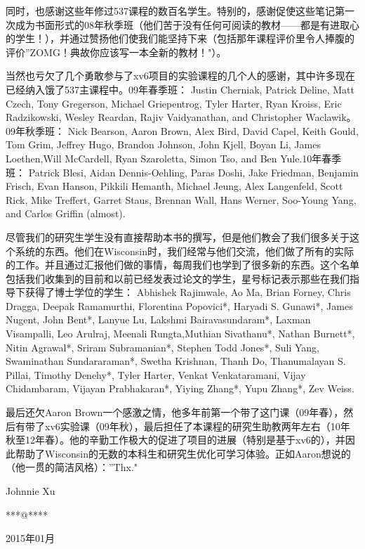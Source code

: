 同时，也感谢这些年修过537课程的数百名学生。特别的，感谢促使这些笔记第一次成为书面形式的08年秋季班（他们苦于没有任何可阅读的教材——都是有进取心的学生！），并通过赞扬他们使我们能坚持下来（包括那年课程评价里令人捧腹的评价”ZOMG！{典故}你应该写一本全新的教材！"）。

当然也亏欠了几个勇敢参与了xv6项目的实验课程的几个人的感谢，其中许多现在已经纳入饿了537主课程中。09年春季班： Justin Cherniak, Patrick Deline, Matt Czech, Tony Gregerson, Michael Griepentrog, Tyler Harter, Ryan Kroiss, Eric Radzikowski, Wesley Reardan, Rajiv Vaidyanathan, and Christopher Waclawik。09年秋季班： Nick Bearson, Aaron  Brown, Alex Bird, David Capel, Keith Gould, Tom Grim, Jeffrey Hugo, Brandon Johnson, John Kjell, Boyan Li, James Loethen,Will McCardell, Ryan Szaroletta, Simon Tso, and Ben Yule.10年春季班： Patrick Blesi, Aidan Dennis-Oehling, Paras Doshi, Jake Friedman, Benjamin Frisch, Evan Hanson, Pikkili Hemanth, Michael Jeung, Alex Langenfeld, Scott Rick, Mike Treffert, Garret Staus, Brennan Wall, Hans Werner, Soo-Young Yang, and Carlos Griffin (almost).

尽管我们的研究生学生没有直接帮助本书的撰写，但是他们教会了我们很多关于这个系统的东西。他们在Wisconsin时，我们经常与他们交流，他们做了所有的实际的工作。并且通过汇报他们做的事情，每周我们也学到了很多新的东西。这个名单包括我们收集到的目前和以前已经发表过论文的学生，星号标记表示那些在我们指导下获得了博士学位的学生： Abhishek Rajimwale, Ao Ma, Brian Forney, Chris Dragga, Deepak Ramamurthi, Florentina Popovici*, Haryadi S. Gunawi*, James Nugent, John Bent*, Lanyue Lu, Lakshmi Bairavasundaram*, Laxman Visampalli, Leo Arulraj, Meenali Rungta,Muthian Sivathanu*, Nathan Burnett*, Nitin Agrawal*, Sriram Subramanian*, Stephen Todd Jones*, Suli Yang, Swaminathan Sundararaman*, Swetha Krishnan, Thanh Do, Thanumalayan S. Pillai, Timothy Denehy*, Tyler Harter, Venkat Venkataramani, Vijay Chidambaram, Vijayan Prabhakaran*, Yiying Zhang*, Yupu Zhang*, Zev
Weiss.

最后还欠Aaron Brown一个感激之情，他多年前第一个带了这门课（09年春），然后有带了xv6实验课（09年秋），最后担任了本课程的研究生助教两年左右（10年秋至12年春）。他的辛勤工作极大的促进了项目的进展（特别是基于xv6的），并因此帮助了Wisconsin的无数的本科生和研究生优化可学习体验。正如Aaron想说的（他一贯的简洁风格）：”Thx."

\vspace{1cm}

\hfill Johnnie Xu\hspace{0.2em}

\hfill ****@**** \hspace{0.2em}

\hfill 2015年01月\hspace{0.2em}
